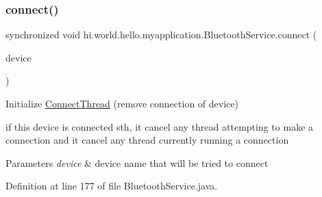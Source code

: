 \subsubsection{\texorpdfstring{connect()}{connect()}}
{\footnotesize\ttfamily synchronized void hi.\+world.\+hello.\+myapplication.\+Bluetooth\+Service.\+connect (\begin{DoxyParamCaption}\item[{Bluetooth\+Device}]{device }\end{DoxyParamCaption})}



Initialize \mbox{\hyperlink{classhi_1_1world_1_1hello_1_1myapplication_1_1_bluetooth_service_1_1_connect_thread}{Connect\+Thread}} (remove connection of device) 

if this device is connected sth, it cancel any thread attempting to make a connection and it cancel any thread currently running a connection 
\begin{DoxyParams}{Parameters}
{\em device} & device name that will be tried to connect \\
\hline
\end{DoxyParams}


Definition at line 177 of file Bluetooth\+Service.\+java.


